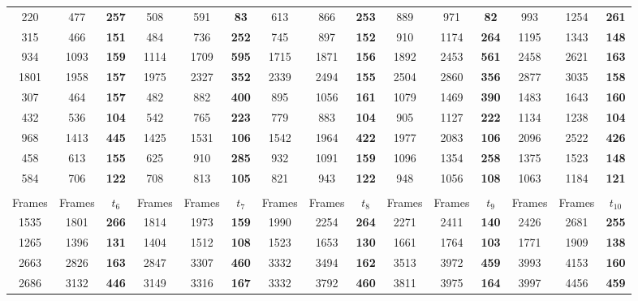\documentclass{scrartcl}
\begin{document}
\begin{figure}[H]
{\begin{tabular}{c| c| >{\bfseries}c| c| c| >{\bfseries}c| c| c| >{\bfseries}c| c| c| >{\bfseries}c| c| c| >{\bfseries}c}
                                \rowcolor{lightgray} 220 & 477 & 257 & 508 & 591 & 83 & 613 & 866 & 253 & 889 & 971 & 82 & 993 & 1254 & 261\\
                                315 & 466 & 151 & 484 & 736 & 252 & 745 & 897 & 152 & 910 & 1174 & 264 & 1195 & 1343 & 148\\
                                \rowcolor{lightgray} 934 & 1093 & 159 & 1114 & 1709 & 595 & 1715 & 1871 & 156 & 1892 & 2453 & 561 & 2458 & 2621 & 163\\
                                1801 & 1958 & 157 & 1975 & 2327 & 352 & 2339 & 2494 & 155 & 2504 & 2860 & 356 & 2877 & 3035 & 158\\
                                \rowcolor{lightgray} 307 & 464 & 157 & 482 & 882 & 400 & 895 & 1056 & 161 & 1079 & 1469 & 390 & 1483 & 1643 & 160\\
                                432 & 536 & 104 & 542 & 765 & 223 & 779 & 883 & 104 & 905 & 1127 & 222 & 1134 & 1238 & 104\\
                                \rowcolor{lightgray} 968 & 1413 & 445 & 1425 & 1531 & 106 & 1542 & 1964 & 422 & 1977 & 2083 & 106 & 2096 & 2522 & 426\\
                                458 & 613 & 155 & 625 & 910 & 285 & 932 & 1091 & 159 & 1096 & 1354 & 258 & 1375 & 1523 & 148\\
                                \rowcolor{lightgray} 584 & 706 & 122 & 708 & 813 & 105 & 821 & 943 & 122 & 948 & 1056 & 108 & 1063 & 1184 & 121\\
                                \\
                                \hline
                                \rowcolor{gray} Frames & Frames & $t_6$ & Frames & Frames & $t_7$ & Frames & Frames & $t_8$ & Frames & Frames & $t_9$ & Frames & Frames & $t_{10}$\\
                                \hline
                                1535 & 1801 & 266 & 1814 & 1973 & 159 & 1990 & 2254 & 264 & 2271 & 2411 & 140 & 2426 & 2681 & 255\\
                                \rowcolor{lightgray} 1265 & 1396 & 131 & 1404 & 1512 & 108 & 1523 & 1653 & 130 & 1661 & 1764 & 103 & 1771 & 1909 & 138\\
                                2663 & 2826 & 163 & 2847 & 3307 & 460 & 3332 & 3494 & 162 & 3513 & 3972 & 459 & 3993 & 4153 & 160\\
                                \rowcolor{lightgray} 2686 & 3132 & 446 & 3149 & 3316 & 167 & 3332 & 3792 & 460 & 3811 & 3975 & 164 & 3997 & 4456 & 459\\

\end{tabular}}
\end{figure}
\end{document}
